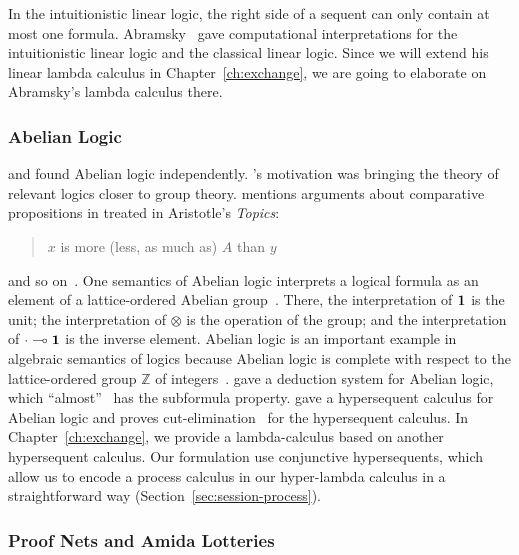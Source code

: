  In the intuitionistic linear logic, the right side of a sequent can only
 contain at most one formula.
 Abramsky~\citep{abramsky1993computational} gave computational
 interpretations for the intuitionistic linear logic and the classical
 linear logic.  Since we will extend his linear lambda calculus in
 Chapter~\ref{ch:exchange}, we are going to elaborate on Abramsky's
 lambda calculus there.

 \subsubsection{Abelian Logic}

 \citet{meyer-slaney-1989} and \citet{casari1989} found Abelian logic
 independently.  \citet{meyer-slaney-1989}'s motivation was bringing the
 theory of relevant logics closer to group theory.
 \citet{casari1989} mentions arguments about comparative propositions in
 treated in Aristotle's \textit{Topics}:
  \begin{quote}
   $x$ is more (less, as much as) $A$ than $y$
  \end{quote}
 and so on~\citep[p.~161]{casari1989}.
 One semantics of Abelian logic interprets a logical formula as an
 element of a lattice-ordered Abelian group~\citep[3.4.2.]{residuated}.  There,
 the interpretation of $\mathbf{1}$ is the unit;
 the interpretation of $\otimes$ is the operation of the group; and
 the interpretation of $\cdot\multimap\mathbf{1}$ is the inverse element.
 Abelian logic is an important example in algebraic semantics of logics
 because Abelian logic is complete with respect to the lattice-ordered
 group $\mathbb Z$ of integers~\citep[pp.~107--108]{residuated}.
 \citet{metcalfe2002} gave a deduction system for Abelian logic,
 which ``almost''~\citep[after Definition~8]{metcalfe2002} has the subformula property.
 \citet{metcalfe2006} gave a hypersequent calculus for Abelian logic and
 proves cut-elimination~\citep[Theorem~5]{metcalfe2006} for the
 hypersequent calculus.
 In Chapter~\ref{ch:exchange}, we provide a lambda-calculus based on
 another hypersequent calculus.  Our formulation use conjunctive
 hypersequents, which allow us to encode a process calculus in our
 hyper-lambda calculus in a straightforward way
 (Section~\ref{sec:session-process}).

 \subsubsection{Proof Nets and Amida Lotteries}
 \label{amidalot}

